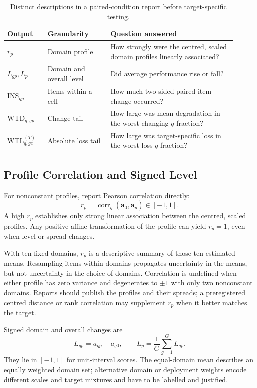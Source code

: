 \documentclass[12pt]{article}
\newcommand{\ins}{\mathrm{INS}}
\newcommand{\wtd}{\mathrm{WTD}}
\newcommand{\wtl}{\mathrm{WTL}}
\begin{document}
\begin{table}[tbp]
\centering\small
\caption{Distinct descriptions in a paired-condition report before target-specific testing.}\label{tab:descriptions}
\begin{tabular}{@{}>{\raggedright\arraybackslash}p{0.16\linewidth}
                    >{\raggedright\arraybackslash}p{0.25\linewidth}
                    >{\raggedright\arraybackslash}p{0.50\linewidth}@{}}
\toprule
Output & Granularity & Question answered \\
\midrule
\(r_p\) & Domain profile & How strongly were the centred, scaled domain profiles linearly associated? \\
\(L_{gp},L_p\) & Domain and overall level & Did average performance rise or fall? \\
\(\ins_{gp}\) & Items within a cell & How much two-sided paired item change occurred? \\
\(\wtd_{q,gp}\) & Change tail & How large was mean degradation in the worst-changing \(q\)-fraction? \\
\(\wtl^{(T)}_{q,gc}\) & Absolute loss tail & How large was target-specific loss in the worst-loss \(q\)-fraction? \\
\bottomrule
\end{tabular}
\end{table}

\subsection{Profile Correlation and Signed Level}\label{ssec:profile_level}

For nonconstant profiles, report Pearson correlation directly:
\[
r_p=\operatorname{corr}_g(\mathbf a_0,\mathbf a_p)\in[-1,1].
\]
A high \(r_p\) establishes only strong linear association between the centred, scaled profiles. Any positive affine transformation of the profile can yield \(r_p=1\), even when level or spread changes.

With ten fixed domains, \(r_p\) is a descriptive summary of those ten estimated means. Resampling items within domains propagates uncertainty in the means, but not uncertainty in the choice of domains. Correlation is undefined when either profile has zero variance and degenerates to \(\pm1\) with only two nonconstant domains. Reports should publish the profiles and their spreads; a preregistered centred distance or rank correlation may supplement \(r_p\) when it better matches the target.

Signed domain and overall changes are
\[
L_{gp}=a_{gp}-a_{g0},
\qquad
L_p=\frac{1}{G}\sum_{g=1}^{G}L_{gp}.
\]
They lie in \([-1,1]\) for unit-interval scores. The equal-domain mean describes an equally weighted domain set; alternative domain or deployment weights encode different scales and target mixtures and have to be labelled and justified.
\end{document}
